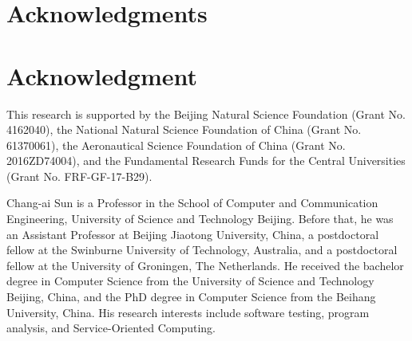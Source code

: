 \documentclass[10pt,journal,compsoc]{IEEEtran}
\begin{document}

\ifCLASSOPTIONcompsoc
  \section*{Acknowledgments}
\else
  \section*{Acknowledgment}
\fi


This research is supported by the Beijing Natural Science Foundation (Grant No. 4162040), the National Natural Science Foundation of China (Grant No. 61370061), the Aeronautical Science Foundation of China (Grant No. 2016ZD74004), and the Fundamental Research Funds for the Central Universities (Grant No. FRF-GF-17-B29).





%

\begin{IEEEbiography}{Chang-ai Sun} is a Professor in the School of Computer and Communication Engineering, University of Science and Technology Beijing. Before that, he was an Assistant Professor at Beijing Jiaotong University, China, a postdoctoral fellow at the Swinburne University of Technology, Australia, and a postdoctoral fellow at the University of Groningen, The Netherlands. He received the bachelor degree in Computer Science from the University of Science and Technology Beijing, China, and the PhD degree in Computer Science from the Beihang University, China. His research interests include software testing, program analysis, and Service-Oriented Computing.
\end{IEEEbiography}
\end{document}

